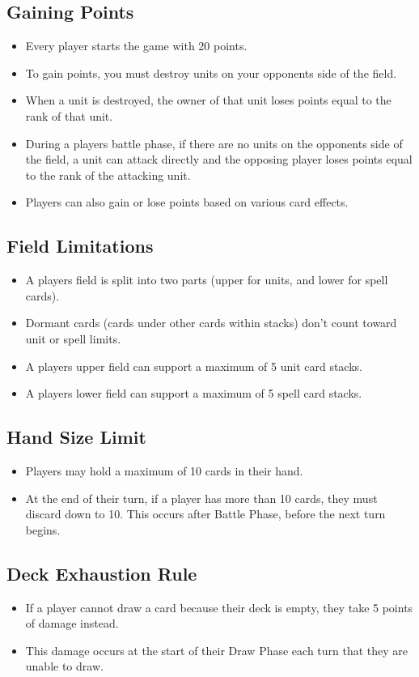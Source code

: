 \subsection{Gaining Points}
\begin{itemize}
    \item Every player starts the game with 20 points.
    \item To gain points, you must destroy units on your opponents side of the field.
    \item When a unit is destroyed, the owner of that unit loses points equal to the rank of that unit.
    \item During a players battle phase, if there are no units on the opponents side of the field, a unit can attack directly and the opposing player loses points equal to the rank of the attacking unit.
    \item Players can also gain or lose points based on various card effects.
\end{itemize}








\subsection{Field Limitations}
\begin{itemize}
    \item A players field is split into two parts (upper for units, and lower for spell cards).
    \item Dormant cards (cards under other cards within stacks) don’t count toward unit or spell limits.
    \item A players upper field can support a maximum of 5 unit card stacks.
    \item A players lower field can support a maximum of 5 spell card stacks.
\end{itemize}








\subsection{Hand Size Limit}
\begin{itemize}
    \item Players may hold a maximum of 10 cards in their hand.
    \item At the end of their turn, if a player has more than 10 cards, they must discard down to 10. This occurs after Battle Phase, before the next turn begins.
\end{itemize}







\subsection{Deck Exhaustion Rule}
\begin{itemize}
    \item If a player cannot draw a card because their deck is empty, they take 5 points of damage instead.
    \item This damage occurs at the start of their Draw Phase each turn that they are unable to draw.
\end{itemize}




